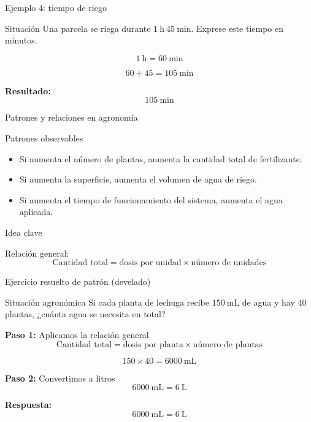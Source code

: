 \documentclass[handout,aspectratio=169,10pt]{beamer}
\newcommand{\idea}[1]{
	\begin{block}{Idea clave}
		#1
	\end{block}
}
\begin{document}
	\begin{frame}{Ejemplo 4: tiempo de riego}
		\begin{block}{Situación}
			Una parcela se riega durante \(1\ \text{h}\ 45\ \text{min}\). Exprese este tiempo en minutos.
		\end{block}
		
		\pause
		\[
		1\ \text{h} = 60\ \text{min}
		\]
		
		\pause
		\[
		60 + 45 = 105\ \text{min}
		\]
		
		\pause
		\textbf{Resultado:}
		\[
		\boxed{105\ \text{min}}
		\]
	\end{frame}
	
	\begin{frame}{Patrones y relaciones en agronomía}
		\begin{block}{Patrones observables}
			\begin{itemize}[<+->]
				\item Si aumenta el número de plantas, aumenta la cantidad total de fertilizante.
				\item Si aumenta la superficie, aumenta el volumen de agua de riego.
				\item Si aumenta el tiempo de funcionamiento del sistema, aumenta el agua aplicada.
			\end{itemize}
		\end{block}
		
		\pause
		\idea{
			Relación general:
			\[
			\text{Cantidad total} = \text{dosis por unidad} \times \text{número de unidades}
			\]
		}
	\end{frame}
	
	\begin{frame}{Ejercicio resuelto de patrón (develado)}
		\begin{block}{Situación agronómica}
			Si cada planta de lechuga recibe \(150\ \text{mL}\) de agua y hay \(40\) plantas, ¿cuánta agua se necesita en total?
		\end{block}
		
		\pause
		\textbf{Paso 1:} Aplicamos la relación general
		\[
		\text{Cantidad total} = \text{dosis por planta} \times \text{número de plantas}
		\]
		
		\pause
		\[
		150 \times 40 = 6000\ \text{mL}
		\]
		
		\pause
		\textbf{Paso 2:} Convertimos a litros
		\[
		6000\ \text{mL} = 6\ \text{L}
		\]
		
		\pause
		\textbf{Respuesta:}
		\[
		\boxed{6000\ \text{mL} = 6\ \text{L}}
		\]
	\end{frame}
	
\end{document}
